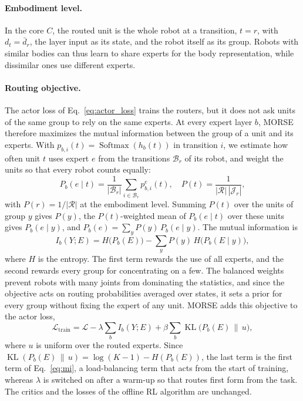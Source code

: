 \paragraph{Embodiment level.}
In the core $C$, the routed unit is the whole robot at a transition, $t=r$, with $d_t=\bar d_r$, the layer input as its state,
and the robot itself as its group. Robots with similar bodies can thus learn to share experts for the body representation,
while dissimilar ones use different experts.

\paragraph{Routing objective.}
The actor loss of Eq.~\eqref{eq:actor_loss} trains the routers, but it does not ask units of the same group to rely
on the same experts. At every expert layer $b$, MORSE therefore maximizes the mutual information between the group of
a unit and its experts. With $p_{b,i}(t)=\operatorname{Softmax}(h_b(t))$ in transition $i$, we estimate how often
unit $t$ uses expert $e$ from the transitions $\mathcal{B}_r$ of its robot, and weight the units so that every robot
counts equally:
\begin{equation}
P_b(e\mid t)=\frac{1}{|\mathcal{B}_r|}\sum_{i\in\mathcal{B}_r}p^e_{b,i}(t),\quad
P(t)=\frac{1}{|\mathcal{R}|\,|\mathcal{J}_r|},
\label{eq:routing_marginals}
\end{equation}
with $P(r)=1/|\mathcal{R}|$ at the embodiment level. Summing $P(t)$ over the units of group $y$ gives $P(y)$, the
$P(t)$-weighted mean of $P_b(e\mid t)$ over these units gives $P_b(e\mid y)$, and $P_b(e)=\sum_yP(y)\,P_b(e\mid y)$.
The mutual information is
\begin{equation}
I_b(Y;E)=H\bigl(P_b(E)\bigr)-\sum_{y}P(y)\,H\bigl(P_b(E\mid y)\bigr),
\label{eq:mi}
\end{equation}
where $H$ is the entropy. The first term rewards the use of all experts, and the second rewards every group for
concentrating on a few. The balanced weights prevent robots with many joints from dominating the statistics, and since
the objective acts on routing probabilities averaged over states, it sets a prior for every group without fixing the
expert of any unit. MORSE adds this objective to the actor loss,
\begin{equation}
\mathcal{L}_{\mathrm{train}}=\mathcal{L}-\lambda\sum_bI_b(Y;E)+\beta\sum_b\operatorname{KL}\bigl(P_b(E)\,\|\,u\bigr),
\label{eq:train}
\end{equation}
where $u$ is uniform over the routed experts. Since $\operatorname{KL}(P_b(E)\,\|\,u)=\log(K-1)-H(P_b(E))$, the last
term is the first term of Eq.~\eqref{eq:mi}, a load-balancing term that acts from the start of training, whereas
$\lambda$ is switched on after a warm-up so that routes first form from the task. The critics and the losses of the
offline RL algorithm are unchanged.


